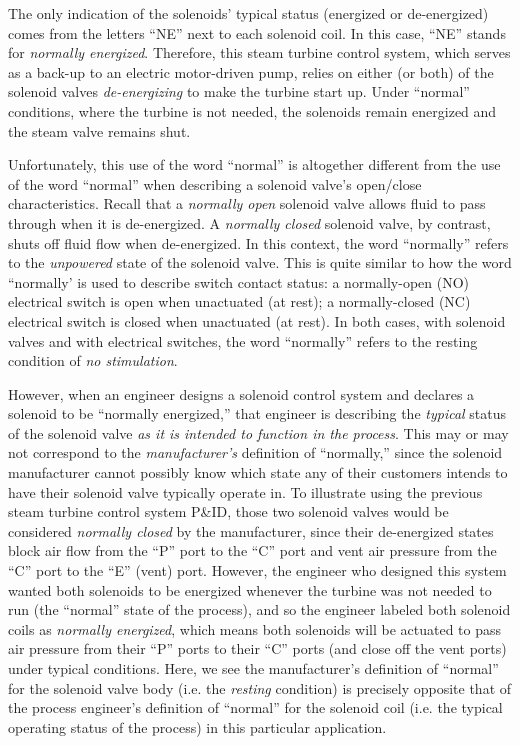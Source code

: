 The only indication of the solenoids' typical status (energized or de-energized) comes from the letters ``NE'' next to each solenoid coil.  In this case, ``NE'' stands for \textit{normally energized}.  Therefore, this steam turbine control system, which serves as a back-up to an electric motor-driven pump, relies on either (or both) of the solenoid valves \textit{de-energizing} to make the turbine start up.  Under ``normal'' conditions, where the turbine is not needed, the solenoids remain energized and the steam valve remains shut.    

\vskip 10pt

Unfortunately, this use of the word ``normal'' is altogether different from the use of the word ``normal'' when describing a solenoid valve's open/close characteristics.  Recall that a \textit{normally open} solenoid valve allows fluid to pass through when it is de-energized.  A \textit{normally closed} solenoid valve, by contrast, shuts off fluid flow when de-energized.  In this context, the word ``normally'' refers to the \textit{unpowered} state of the solenoid valve.  This is quite similar to how the word ``normally' is used to describe switch contact status: a normally-open (NO) electrical switch is open when unactuated (at rest); a normally-closed (NC) electrical switch is closed when unactuated (at rest).  In both cases, with solenoid valves and with electrical switches, the word ``normally'' refers to the resting condition of \textit{no stimulation}.    

However, when an engineer designs a solenoid control system and declares a solenoid to be ``normally energized,'' that engineer is describing the \textit{typical} status of the solenoid valve \textit{as it is intended to function in the process}.  This may or may not correspond to the \textit{manufacturer's} definition of ``normally,'' since the solenoid manufacturer cannot possibly know which state any of their customers intends to have their solenoid valve typically operate in.  To illustrate using the previous steam turbine control system P\&ID, those two solenoid valves would be considered \textit{normally closed} by the manufacturer, since their de-energized states block air flow from the ``P'' port to the ``C'' port and vent air pressure from the ``C'' port to the ``E'' (vent) port.  However, the engineer who designed this system wanted both solenoids to be energized whenever the turbine was not needed to run (the ``normal'' state of the process), and so the engineer labeled both solenoid coils as \textit{normally energized}, which means both solenoids will be actuated to pass air pressure from their ``P'' ports to their ``C'' ports (and close off the vent ports) under typical conditions.  Here, we see the manufacturer's definition of ``normal'' for the solenoid valve body (i.e. the \textit{resting} condition) is precisely opposite that of the process engineer's definition of ``normal'' for the solenoid coil (i.e. the typical operating status of the process) in this particular application.

